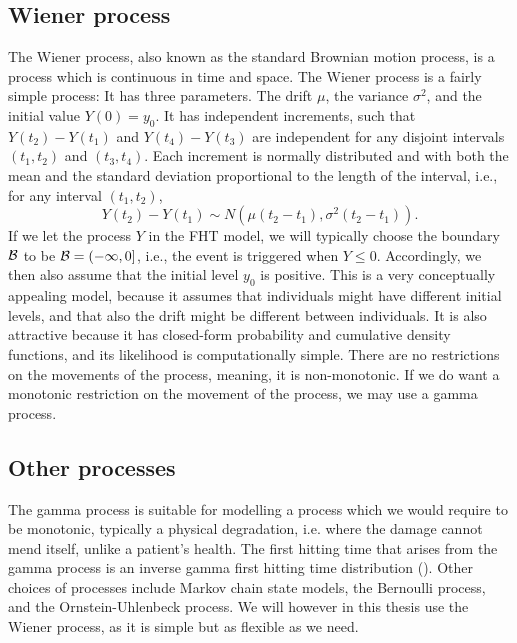 \subsection{Wiener process}\label{sec:wiener}
The Wiener process, also known as the standard Brownian motion process, is a process which is continuous in time and space. The Wiener process is a fairly simple process: It has three parameters. The drift $\mu$, the variance $\sigma^2$, and the initial value $Y(0)=y_0$. It has independent increments, such that $Y(t_2)-Y(t_1)$ and $Y(t_4)-Y(t_3)$ are independent for any disjoint intervals $(t_1,t_2)$ and $(t_3,t_4)$. Each increment is normally distributed and with both the mean and the standard deviation proportional to the length of the interval, i.e., for any interval $(t_1, t_2)$,
\begin{equation}
    Y(t_2)-Y(t_1)\sim N(\mu(t_2-t_1), \sigma^2(t_2-t_1)).
\end{equation}
If we let the process $Y$ in the FHT model, we will typically choose the boundary $\mathcal{B}$ to be $\mathcal{B}=(-\infty,0]$, i.e., the event is triggered when $Y\leq0$. Accordingly, we then also assume that the initial level $y_0$ is positive. This is a very conceptually appealing model, because it assumes that individuals might have different initial levels, and that also the drift might be different between individuals. It is also attractive because it has closed-form probability and cumulative density functions, and its likelihood is computationally simple. There are no restrictions on the movements of the process, meaning, it is non-monotonic. If we do want a monotonic restriction on the movement of the process, we may use a gamma process.

\subsection{Other processes}
The gamma process is suitable for modelling a process which we would require to be monotonic, typically a physical degradation, i.e. where the damage cannot mend itself, unlike a patient's health. The first hitting time that arises from the gamma process is an inverse gamma first hitting time distribution (\cite[503]{leewhitmore2006}). Other choices of processes include Markov chain state models, the Bernoulli process, and the Ornstein-Uhlenbeck process. We will however in this thesis use the Wiener process, as it is simple but as flexible as we need.

